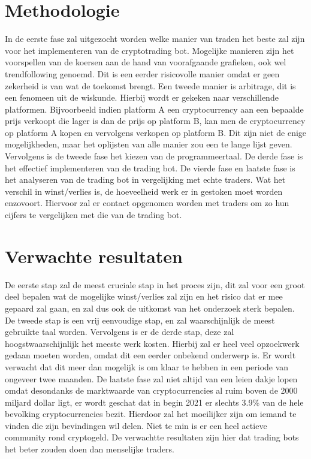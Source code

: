 \section{Methodologie}
\label{sec:methodologie}

In de eerste fase zal uitgezocht worden welke manier van traden het beste zal zijn voor het implementeren van de cryptotrading bot. Mogelijke manieren zijn het voorspellen van de koersen aan de hand van voorafgaande grafieken, ook wel trendfollowing genoemd. Dit is een eerder risicovolle manier omdat er geen zekerheid is van wat de toekomst brengt. Een tweede manier is arbitrage, dit is een fenomeen uit de wiskunde. Hierbij wordt er gekeken naar verschillende platformen. Bijvoorbeeld indien platform A een cryptocurrency aan een bepaalde prijs verkoopt die lager is dan de prijs op platform B, kan men de cryptocurrency op platform A kopen en vervolgens verkopen op platform B. Dit zijn niet de enige mogelijkheden, maar het oplijsten van alle manier zou een te lange lijst geven. Vervolgens is de tweede fase het kiezen van de programmeertaal. De derde fase is het effectief implementeren van de trading bot. De vierde fase en laatste fase is het analyseren van de trading bot in vergelijking met echte traders. Wat het verschil in winst/verlies is, de hoeveelheid werk er in gestoken moet worden enzovoort. Hiervoor zal er contact opgenomen worden met traders om zo hun cijfers te vergelijken met die van de trading bot.

\section{Verwachte resultaten}
\label{sec:verwachte_resultaten}

De eerste stap zal de meest cruciale stap in het proces zijn, dit zal voor een groot deel bepalen wat de mogelijke winst/verlies zal zijn en het risico dat er mee gepaard zal gaan, en zal dus ook de uitkomst van het onderzoek sterk bepalen. De tweede stap is een vrij eenvoudige stap, en zal waarschijnlijk de meest gebruikte taal worden. Vervolgens is er de derde stap, deze zal hoogstwaarschijnlijk het meeste werk kosten. Hierbij zal er heel veel opzoekwerk gedaan moeten worden, omdat dit een eerder onbekend onderwerp is. Er wordt verwacht dat dit meer dan mogelijk is om klaar te hebben in een periode van ongeveer twee maanden. De laatste fase zal niet altijd van een leien dakje lopen omdat desondanks de marktwaarde van cryptocurrencies al ruim boven de 2000 miljard dollar ligt, er wordt geschat dat in begin 2021 er slechts 3.9\% van de hele bevolking cryptocurrencies bezit. \autocite{Triple2021} Hierdoor zal het moeilijker zijn om iemand te vinden die zijn bevindingen wil delen. Niet te min is er een heel actieve community rond cryptogeld. De verwachtte resultaten zijn hier dat trading bots het beter zouden doen dan menselijke traders.

